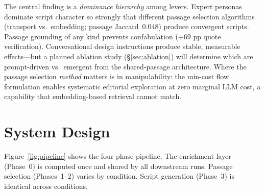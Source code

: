 \documentclass[final]{clv2025}
\begin{document}
The central finding is a \emph{dominance hierarchy} among levers.
Expert personas dominate script character so strongly that different
passage selection algorithms (transport vs.\ embedding; passage
Jaccard~0.048) produce convergent scripts.  Passage grounding of any
kind prevents confabulation (+69 pp quote verification).
Conversational design instructions produce stable, measurable
effects---but a planned ablation study (\S\ref{sec:ablation}) will
determine which are prompt-driven vs.\ emergent from the shared-passage
architecture.  Where the passage selection \emph{method} matters is in
manipulability: the min-cost flow formulation enables systematic
editorial exploration at zero marginal LLM cost, a capability that
embedding-based retrieval cannot match.


\section{System Design}
\label{sec:design}

Figure~\ref{fig:pipeline} shows the four-phase pipeline.  The
enrichment layer (Phase~0) is computed once and shared by all
downstream runs.  Passage selection (Phases~1--2) varies by condition.
Script generation (Phase~3) is identical across conditions.
\end{document}
